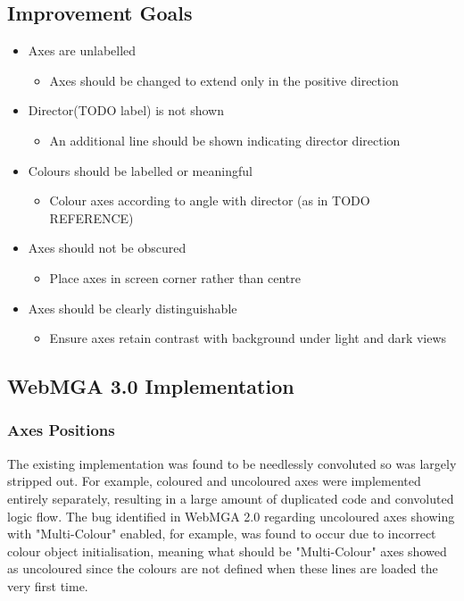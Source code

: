 \subsection{Improvement Goals}
\begin{itemize}
  \item Axes are unlabelled
    \begin{itemize}
      \item Axes should be changed to extend only in the positive direction
    \end{itemize}
  \item Director(TODO label) is not shown
    \begin{itemize}
      \item An additional line should be shown indicating director direction
    \end{itemize}
  \item Colours should be labelled or meaningful
    \begin{itemize}
      \item Colour axes according to angle with director (as in TODO REFERENCE)
    \end{itemize}
  \item Axes should not be obscured
    \begin{itemize}
      \item Place axes in screen corner rather than centre
    \end{itemize}
  \item Axes should be clearly distinguishable
    \begin{itemize}
      \item Ensure axes retain contrast with background under light and dark views
    \end{itemize}
\end{itemize}

\subsection{WebMGA 3.0 Implementation}
\subsubsection{Axes Positions}
The existing implementation was found to be needlessly convoluted so was largely stripped out. For example, coloured and uncoloured axes were implemented entirely separately, resulting in a large amount of duplicated code and convoluted logic flow. The bug identified in WebMGA 2.0 regarding uncoloured axes showing with "Multi-Colour" enabled, for example, was found to occur due to incorrect colour object initialisation, meaning what should be "Multi-Colour" axes showed as uncoloured since the colours are not defined when these lines are loaded the very first time.


